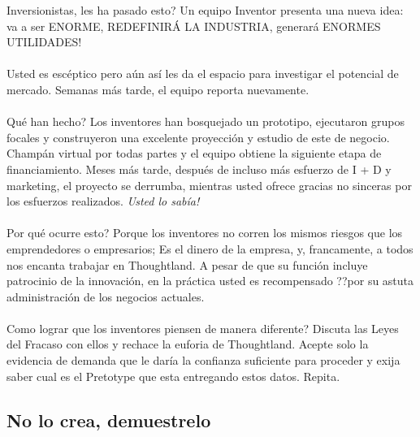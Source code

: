 \documentclass{article}
\begin{document}
Inversionistas, les ha pasado esto? Un equipo Inventor presenta una nueva idea: va a ser ENORME, REDEFINIR\'A LA INDUSTRIA, generar\'a ENORMES UTILIDADES!
\\ \\
Usted es esc\'eptico pero a\'un as\'i les da el espacio para investigar el potencial de mercado. Semanas m\'as tarde, el equipo reporta nuevamente.
\\ \\
Qu\'e han hecho? Los inventores han bosquejado un prototipo, ejecutaron grupos focales y construyeron una excelente proyecci\'on y estudio de este de negocio. Champ\'an virtual por todas partes y el equipo obtiene la siguiente etapa de financiamiento. Meses m\'as tarde, despu\'es de incluso m\'as esfuerzo de I + D y marketing, el proyecto se derrumba, mientras usted ofrece gracias no sinceras por los esfuerzos realizados. \textit{Usted lo sab\'ia!}
\\ \\
Por qu\'e ocurre esto? Porque los inventores no corren los mismos riesgos que los emprendedores o empresarios; Es el dinero de la empresa, y, francamente, a todos nos encanta trabajar en Thoughtland. A pesar de que su funci\'on incluye patrocinio de la innovaci\'on, en la pr\'actica usted es recompensado ??por su astuta administraci\'on de los negocios actuales.
\\ \\
Como lograr que los inventores piensen de manera diferente? Discuta las Leyes del Fracaso con ellos y rechace la euforia de Thoughtland. Acepte solo la evidencia de demanda que le dar\'ia la confianza suficiente para proceder y exija saber cual es el Pretotype que esta entregando estos datos. Repita.

\subsection{No lo crea, demuestrelo}
\end{document}
